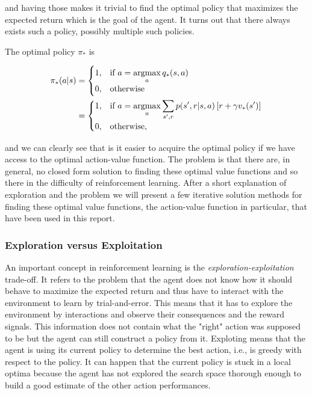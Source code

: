 \documentclass[result.tex]{subfiles}
\begin{document}
    and having those makes it trivial to find the optimal policy that maximizes the expected return which is the goal of the agent. It turns out that there always exists such a policy, possibly multiple such policies.

    The optimal policy $\pi_\ast$ is

    \begin{align*}
        \pi_\ast(a | s) &=
        \begin{cases}
            1, & \text{if}\ a = \displaystyle\operatorname*{argmax}_{a} q_\ast(s, a) \\
            0, & \text{otherwise}
        \end{cases} \\
        &=
        \begin{cases}
            1, & \text{if}\ a = \displaystyle\operatorname*{argmax}_{a} \sum_{s^\prime, r} p(s^\prime, r | s, a) \left[ r + \gamma v_\ast(s^\prime) \right] \\
            0, & \text{otherwise},
        \end{cases} \\
    \end{align*}

    and we can clearly see that is it easier to acquire the optimal policy if we have access to the optimal action-value function. The problem is that there are, in general, no closed form solution to finding these optimal value functions and so there in the difficulty of reinforcement learning. After a short explanation of exploration and the problem we will present a few iterative solution methods for finding these optimal value functions, the action-value function in particular, that have been used in this report.

    \subsubsection*{Exploration versus Exploitation}

    An important concept in reinforcement learning is the \textit{exploration-exploitation} trade-off. It refers to the problem that the agent does not know how it should behave to maximize the expected return and thus have to interact with the environment to learn by trial-and-error. This means that it has to explore the environment by interactions and observe their consequences and the reward signals. This information does not contain what the "right" action was supposed to be but the agent can still construct a policy from it. Exploting means that the agent is using its current policy to determine the best action, i.e., is greedy with respect to the policy. It can happen that the current policy is stuck in a local optima because the agent has not explored the search space thorough enough to build a good estimate of the other action performances.
\end{document}
